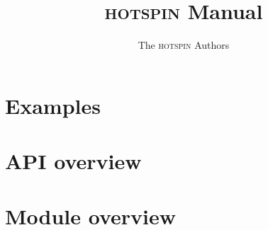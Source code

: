\documentclass[a4paper, twoside]{article}
\newcommand{\mumax}{\textsc{hotspin}\xspace}
\begin{document}
\hypersetup{breaklinks=true}
\setlength{\parindent}{0cm}

\title{\mumax Manual}
\author{The \mumax Authors}
\maketitle


\tableofcontents




\section{Examples} \label{examples}



\section{API overview}


\section{Module overview}\label{modules}


\appendix

%
\printindex
\end{document}
